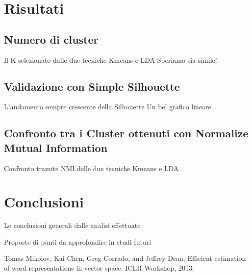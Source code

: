 \documentclass[
12pt, %
a4paper, %
oneside, %
headinclude,footinclude, %
BCOR5mm, %
]{scrartcl}
\begin{document}
\section{Risultati}

	\subsection{Numero di cluster}

		Il K selezionato dalle due tecniche Kmeans e LDA
		Speriamo sia simile!

	\subsection{Validazione con Simple Silhouette}

		L'andamento sempre crescente della Silhouette
		Un bel grafico lineare

	\subsection{Confronto tra i Cluster ottenuti con Normalize Mutual Information}

		Confronto tramite NMI delle due tecniche Kmeans e LDA


\section{Conclusioni}

	Le conclusioni generali dalle analisi effettuate

	Proposte di punti da approfondire in studi futuri





\begin{thebibliography}{12}

    Tomas Mikolov, Kai Chen, Greg Corrado, and Jeffrey Dean. Efficient estimation of word representations
    in vector space. ICLR Workshop, 2013.


\end{thebibliography}

\end{document}
